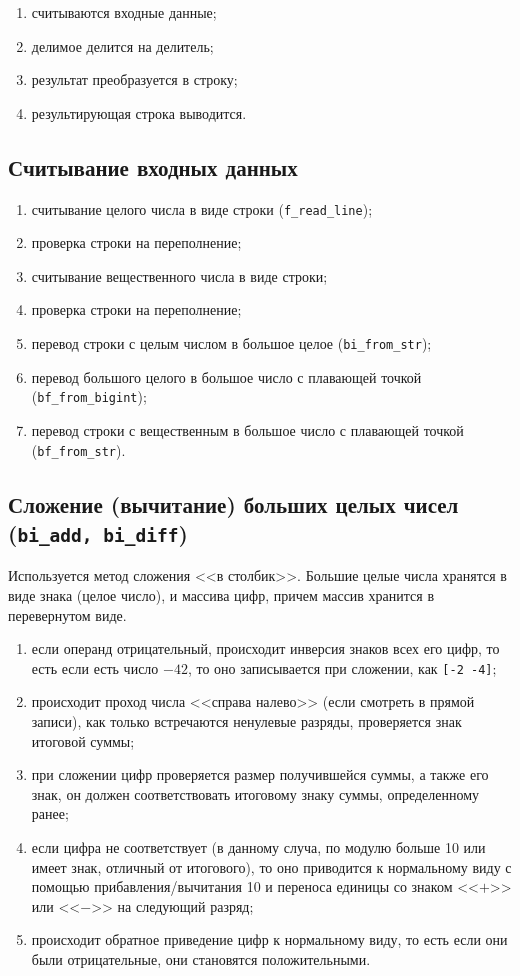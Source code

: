 \documentclass[a4paper,12pt]{extarticle}
\begin{document}
\begin{enumerate}
    \item считываются входные данные;
    \item делимое делится на делитель;
    \item результат преобразуется в строку;
    \item результирующая строка выводится.
\end{enumerate}

\subsection{Считывание входных данных}
\begin{enumerate}
    \item считывание целого числа в виде строки (\texttt{f\_read\_line});
    \item проверка строки на переполнение;
    \item считывание вещественного числа в виде строки;
    \item проверка строки на переполнение;
    \item перевод строки с целым числом в большое целое (\texttt{bi\_from\_str});
    \item перевод большого целого в большое число с плавающей точкой (\texttt{bf\_from\_bigint});
    \item перевод строки с вещественным в большое число с плавающей точкой (\texttt{bf\_from\_str}).
\end{enumerate}

\subsection{Сложение (вычитание) больших целых чисел (\texttt{bi\_add, bi\_diff})}
Используется метод сложения <<в столбик>>. Большие целые числа хранятся в виде знака (целое число), и массива цифр, причем массив хранится в перевернутом виде.

\begin{enumerate}
    \item если операнд отрицательный, происходит инверсия знаков всех его цифр, то есть если есть число $-42$, то оно записывается при сложении, как \texttt{[-2 -4]};
    \item происходит проход числа <<справа налево>> (если смотреть в прямой записи), как только встречаются ненулевые разряды, проверяется знак итоговой суммы;
    \item при сложении цифр проверяется размер получившейся суммы, а также его знак, он должен соответствовать итоговому знаку суммы, определенному ранее;
    \item если цифра не соответствует (в данному случа, по модулю больше 10 или имеет знак, отличный от итогового), то оно приводится к нормальному виду с помощью прибавления/вычитания 10 и переноса единицы со знаком <<$+$>> или <<$-$>> на следующий разряд;
    \item происходит обратное приведение цифр к нормальному виду, то есть если они были отрицательные, они становятся положительными.
\end{enumerate}
\end{document}
